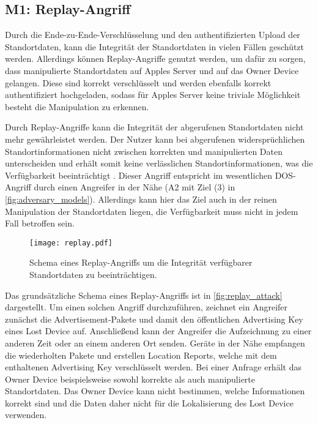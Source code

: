 \subsection[M1]{M1: Replay-Angriff}
\label{missbrauch:1}
Durch die Ende-zu-Ende-Verschlüsselung und den authentifizierten Upload der Standortdaten, kann die Integrität der Standortdaten in vielen Fällen geschützt werden.
Allerdings können Replay-Angriffe genutzt werden, um dafür zu sorgen, dass manipulierte Standortdaten auf Apples Server und auf das Owner Device gelangen.
Diese sind korrekt verschlüsselt und werden ebenfalls korrekt authentifiziert hochgeladen, sodass für Apples Server keine triviale Möglichkeit besteht die Manipulation zu erkennen.

Durch Replay-Angriffe kann die Integrität der abgerufenen Standortdaten nicht mehr gewährleistet werden.
Der Nutzer kann bei abgerufenen widersprüchlichen Standortinformationen nicht zwischen korrekten und manipulierten Daten unterscheiden und erhält somit keine verlässlichen Standortinformationen, was die Verfügbarkeit beeinträchtigt \cite{Heinrich_FindMy}.
Dieser Angriff entspricht im wesentlichen \ac{DOS}-Angriff durch einen Angreifer in der Nähe (A2 mit Ziel (3) in \autoref{fig:adversary_models}).
Allerdings kann hier das Ziel auch in der reinen Manipulation der Standortdaten liegen, die Verfügbarkeit muss nicht in jedem Fall betroffen sein.
\begin{figure}[ht]
    \centering
    \texttt{[image: replay.pdf]}
    \caption{Schema eines Replay-Angriffs um die Integrität verfügbarer Standortdaten zu beeinträchtigen.}
    \label{fig:replay_attack}  
\end{figure}

Das grundsätzliche Schema eines Replay-Angriffs ist in \autoref{fig:replay_attack} dargestellt.
Um einen solchen Angriff durchzuführen, zeichnet ein Angreifer zunächst die Advertisement-Pakete und damit den öffentlichen Advertising Key eines Lost Device auf.
Anschließend kann der Angreifer die Aufzeichnung zu einer anderen Zeit oder an einem anderen Ort senden.
Geräte in der Nähe empfangen die wiederholten Pakete und erstellen Location Reports, welche mit dem enthaltenen Advertising Key verschlüsselt werden.
Bei einer Anfrage erhält das Owner Device beispielsweise sowohl korrekte als auch manipulierte Standortdaten.
Das Owner Device kann nicht bestimmen, welche Informationen korrekt sind und die Daten daher nicht für die Lokalisierung des Lost Device verwenden.

